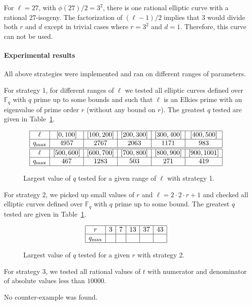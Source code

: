 \documentclass[12pt]{article}
\theoremstyle{plain}
\theoremstyle{definition}
\def\F{\ensuremath{\mathbb{F}}}
\begin{document}
For $\ell = 27$, with $\phi(27)/2 = 3^2$,
there is one rational elliptic curve with a rational $27$-isogeny.
The factorization of $(\ell-1)/2$ implies
that $3$ would divide both $r$ and $d$
except in trivial cases where $r = 3^2$ and $d = 1$.
Therefore, this curve can not be used.

\paragraph{Experimental results}
All above strategies were implemented and ran on different ranges of parameters.

For strategy 1, for different ranges of $\ell$ we tested all elliptic curves
defined over $\F_q$ with $q$ prime up to some bounds
and such that $\ell$ is an Elkies prime with an eigenvalue
of prime order $r$ (without any bound on $r$).
The greatest $q$ tested are given in Table~\ref{table:strat1}.
\begin{figure}[!ht]
\[
\begin{array}{|*{6}{c|}}
\hline
\ell & [0, 100] & [100, 200] & [200, 300] & [300, 400] & [400, 500] \\
\hline
q_{\max} & 4957 & 2767 & 2063 & 1171 & 983 \\
\hline
\hline
\ell & [500, 600] & [600, 700] & [700, 800] & [800, 900] & [900, 1001] \\
\hline
q_{\max} & 467 & 1283 & 503 & 271 & 419 \\
\hline
\end{array}
\]
\caption{Largest value of $q$ tested for a given range of $\ell$ with strategy 1.}
\label{table:strat1}
\end{figure}

For strategy 2, we picked up small values of $r$ and $\ell = 2 \cdot 2 \cdot r + 1$
and checked all elliptic curves defined over $\F_q$ with $q$ prime up
to some bound.
The greatest $q$ tested are given in Table~\ref{table:strat1}.
\begin{figure}[!ht]
\[
\begin{array}{|*{6}{c|}}
\hline
r & 3 & 7 & 13 & 37 & 43 \\
\hline
q_{\max} & & & & & \\
\hline
\end{array}
\]
\caption{Largest value of $q$ tested for a given $r$ with strategy 2.}
\label{table:strat2}
\end{figure}

For strategy 3, we tested all rational values of $t$
with numerator and denominator of absolute values less than $10000$.

No counter-example was found.



\end{document}
